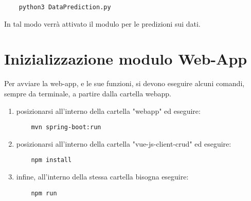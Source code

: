 \begin{lstlisting}
    python3 DataPrediction.py
\end{lstlisting}
In tal modo verrà attivato il modulo per le predizioni sui dati.


\section{Inizializzazione modulo Web-App}\label{ProceduraDiInstallazioneInizializzazioneModuloWebApp}
Per avviare la web-app, e le sue funzioni, si devono eseguire alcuni comandi, sempre da terminale, a partire dalla cartella webapp.
\begin{enumerate}
  \item posizionarsi all'interno della cartella "webapp" ed eseguire:
  \begin{lstlisting}
    mvn spring-boot:run
  \end{lstlisting}
  \item posizionarsi all'interno della cartella "vue-js-client-crud" ed eseguire:
  \begin{lstlisting}
    npm install
  \end{lstlisting}
  \item infine, all'interno della stessa cartella bisogna eseguire:
  \begin{lstlisting}
    npm run
  \end{lstlisting}
\end{enumerate}

